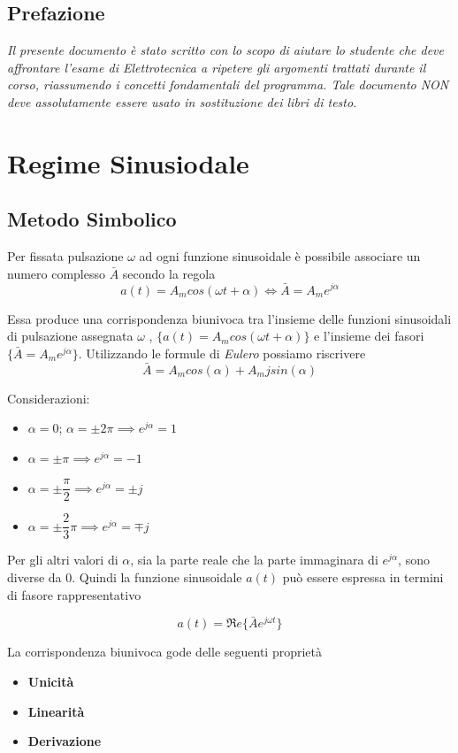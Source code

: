 \documentclass[a4paper]{report}
\begin{document}
\section*{Prefazione}
\emph{Il presente documento \`e stato scritto con lo scopo di aiutare
  lo studente che deve affrontare l'esame di Elettrotecnica a ripetere
  gli argomenti trattati durante il corso, riassumendo i concetti
  fondamentali del programma. Tale documento NON deve assolutamente
  essere usato in sostituzione dei libri di testo.}
\tableofcontents

\chapter{Regime Sinusiodale}
\section{Metodo Simbolico}
Per fissata pulsazione $\omega$ ad ogni funzione sinusoidale \`e
possibile associare un numero complesso $\bar{A}$ secondo la regola
\[
a(t) = A_mcos(\omega t+\alpha)\iff \bar{A} = A_me^{j\alpha}
\]

Essa produce una corrispondenza biunivoca tra l'insieme delle funzioni
sinusoidali di pulsazione assegnata $\omega$ , $\{
a(t)=A_mcos(\omega t+\alpha )\}$ e l'insieme dei fasori $\{ \bar{A} =
A_me^{j\alpha} \}$.
Utilizzando le formule di \emph{Eulero} possiamo riscrivere
\[
\bar{A} = A_mcos(\alpha)+ A_mjsin(\alpha)
\]

Considerazioni:
\begin{itemize}
\item $\alpha = 0$; $\alpha=\pm 2\pi \implies e^{j\alpha} = 1$
\item $\alpha = \pm \pi \implies e^{j\alpha} = -1$
\item $\alpha = \pm \dfrac{\pi}{2} \implies e^{j\alpha} = \pm j$
\item $\alpha = \pm \dfrac{2}{3}\pi \implies e^{j\alpha} = \mp j$
\end{itemize}
Per gli altri valori di $\alpha$, sia la parte reale che la parte
immaginara di $e^{j\alpha}$, sono diverse da $0$.
Quindi la funzione sinusoidale $a(t)$ pu\`o essere espressa in termini
di fasore rappresentativo

\[
a(t)=\Re e\{\bar{A}e^{j\omega t}\}
\]

La corrispondenza biunivoca gode delle seguenti propriet\`a
\begin{itemize}
\item {\bf Unicit\`a}
\item {\bf Linearit\`a}
\item {\bf Derivazione}
\end{itemize}
\end{document}
